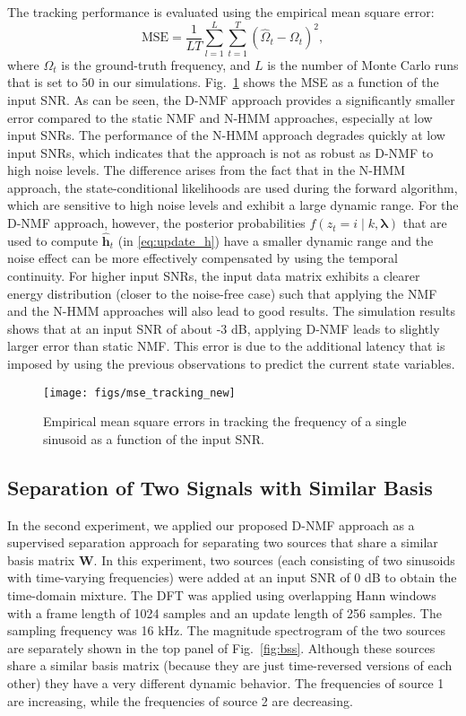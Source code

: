 \documentclass[10pt,twocolumn,twoside] {IEEEtran}
\begin{document}
The tracking performance is evaluated using the empirical mean square
error:
\begin{equation}
\text{MSE}=\frac{1}{LT}\sum_{l=1}^{L}\sum_{t=1}^{T}\left(\hat{\Omega}_{t}-\Omega_{t}\right)^{2},
\end{equation}
where $\Omega_{t}$ is the ground-truth frequency, and $L$ is the number
of Monte Carlo runs that is set to $50$ in our simulations. Fig.~\ref{fig:Empirical-MSE}
shows the MSE as a function of the input SNR. As can be seen, the D-NMF
approach provides a significantly smaller error compared to the static NMF and N-HMM approaches, especially at low input SNRs. The performance of the N-HMM approach degrades quickly at low input SNRs, which indicates that the approach is not as robust as D-NMF to high noise levels. The difference arises from the fact that in the N-HMM approach, the state-conditional likelihoods are used during the forward algorithm, which are sensitive to high noise levels and exhibit a large dynamic range. For the D-NMF approach, however, the posterior probabilities $f\left(z_{t}=i\mid k,\boldsymbol{\lambda}\right)$ that are used to compute $\hat{\mathbf{h}}_{t}$ (in \eqref{eq:update_h}) have a smaller dynamic range and the noise effect can be more effectively compensated by using the temporal continuity.
For higher input SNRs, the input data matrix exhibits a
clearer energy distribution (closer to the noise-free case) such
that applying the NMF and the N-HMM approaches will also lead to good results. The simulation results shows
that at an input SNR of about -3 dB, applying D-NMF leads to slightly
larger error than static NMF. This error is due to the additional latency that is
imposed by using the previous observations to predict the current
state variables.
\begin{figure}
\texttt{[image: figs/mse\_tracking\_new]}\caption{\label{fig:Empirical-MSE} Empirical mean square errors in tracking
the frequency of a single sinusoid as a function of the input SNR.}
\end{figure}



\subsection{Separation of Two Signals with Similar Basis\label{sub:Separation}}

In the second experiment, we applied our proposed D-NMF approach as a supervised separation approach for separating two
sources that share a similar basis matrix $\mathbf{W}$. In this experiment, two sources
(each consisting of two sinusoids with time-varying frequencies) were added at an input SNR of 0 dB to obtain the time-domain mixture. The DFT was applied using overlapping Hann windows with a frame length of 1024 samples and an update length
of 256 samples. The sampling frequency was 16 kHz. The magnitude spectrogram of the two sources are separately shown
in the top panel of Fig.~\ref{fig:bss}. Although these sources share
a similar basis matrix (because they are just time-reversed
versions of each other) they have a very different dynamic behavior.
The frequencies of source 1 are increasing, while the frequencies of source 2 are decreasing.
\end{document}
